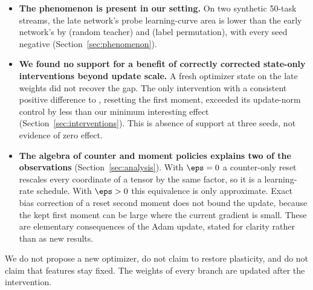 \begin{itemize}
\item \textbf{The phenomenon is present in our setting.} On two synthetic 50-task streams, the late
network's probe learning-curve area is lower than the early network's by \RTLateMinusEarlyAuc{}
(random teacher) and \LPLateMinusEarlyAuc{} (label permutation), with every seed negative
(Section~\ref{sec:phenomenon}).
\item \textbf{We found no support for a benefit of correctly corrected state-only interventions beyond
update scale.} A fresh optimizer state on the late weights did not recover the gap. The only intervention
with a consistent positive difference to \keep{}, resetting the first moment, exceeded its
update-norm control by less than our minimum interesting effect (Section~\ref{sec:interventions}).
This is absence of support at three seeds, not evidence of zero effect.
\item \textbf{The algebra of counter and moment policies explains two of the observations}
(Section~\ref{sec:analysis}). With $\eps=0$ a counter-only reset rescales every coordinate of a tensor
by the same factor, so it is a learning-rate schedule. With $\eps>0$ this equivalence is only
approximate. Exact bias correction of a reset second moment does not bound the update, because the kept
first moment can be large where the current gradient is small. These are elementary consequences of the
Adam update, stated for clarity rather than as new results.
\end{itemize}

We do not propose a new optimizer, do not claim to restore plasticity, and do not claim that features
stay fixed. The weights of every branch are updated after the intervention.
